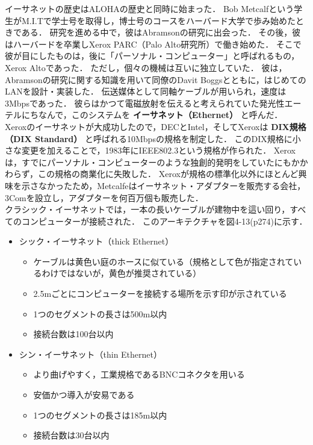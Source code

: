 \documentclass[a4paper]{ltjsarticle}
\begin{document}
イーサネットの歴史はALOHAの歴史と同時に始まった． Bob
Metcalfという学生がM.I.Tで学士号を取得し，博士号のコースをハーバード大学で歩み始めたときである．
研究を進める中で，彼はAbramsonの研究に出会った．
その後，彼はハーバードを卒業しXerox PARC（Palo
Alto研究所）で働き始めた．
そこで彼が目にしたものは，後に「パーソナル・コンピューター」と呼ばれるもの，Xerox
Altoであった． ただし，個々の機械は互いに独立していた．
彼は，Abramsonの研究に関する知識を用いて同僚のDavit
Boggsとともに，はじめてのLANを設計・実装した．
伝送媒体として同軸ケーブルが用いられ，速度は3Mbpsであった．
彼らはかつて電磁放射を伝えると考えられていた発光性エーテルにちなんで，このシステムを
\textbf{イーサネット（Ethernet）} と呼んだ．\\
Xeroxのイーサネットが大成功したので，DECとIntel，そしてXeroxは
\textbf{DIX規格（DIX Standard）} と呼ばれる10Mbpsの規格を制定した．
このDIX規格に小さな変更を加えることで，1983年にIEEE802.3という規格が作られた．
Xeroxは，すでにパーソナル・コンピューターのような独創的発明をしていたにもかかわらず，この規格の商業化に失敗した．
Xeroxが規格の標準化以外にほとんど興味を示さなかったため，Metcalfeはイーサネット・アダプターを販売する会社，3Comを設立し，アダプターを何百万個も販売した．\\
クラシック・イーサネットでは，一本の長いケーブルが建物中を這い回り，すべてのコンピューターが接続された．
このアーキテクチャを図4-13(p274)に示す．

\begin{itemize}
\item
  シック・イーサネット（thick Ethernet）

  \begin{itemize}
  \item
    ケーブルは黄色い庭のホースに似ている（規格として色が指定されているわけではないが，黄色が推奨されている）
  \item
    2.5mごとにコンピューターを接続する場所を示す印が示されている
  \item
    1つのセグメントの長さは500m以内
  \item
    接続台数は100台以内
  \end{itemize}
\item
  シン・イーサネット（thin Ethernet）

  \begin{itemize}
  \item
    より曲げやすく，工業規格であるBNCコネクタを用いる
  \item
    安価かつ導入が安易である
  \item
    1つのセグメントの長さは185m以内
  \item
    接続台数は30台以内
  \end{itemize}
\end{itemize}
\end{document}
